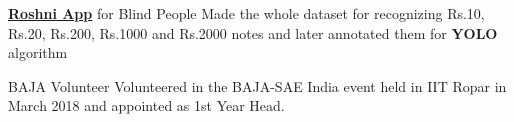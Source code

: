 
\begin{misc}


\cvskill
    {\href{https://www.digit.in/news/apps/roshni-an-android-app-to-help-the-visually-impaired-recognize-currency-notes-46026.html}{\textbf{Roshni App}} for Blind People} %
    {{Made the whole dataset for recognizing Rs.10, Rs.20, Rs.200, Rs.1000 and Rs.2000 notes and later annotated them for \textbf{YOLO} algorithm}}

\cvskill
    {BAJA Volunteer} %
    {{Volunteered in the BAJA-SAE India event held in IIT Ropar in March 2018 and appointed as 1st Year Head.}}

   



    



\end{misc}
